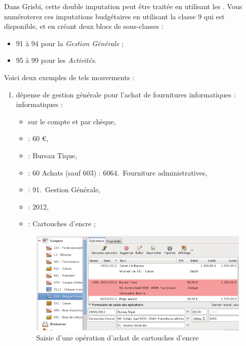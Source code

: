 Dans Grisbi, cette double imputation peut être traitée en utilisant les . Vous numéroterez ces imputations budgétaires en utilisant la classe 9 qui est disponible, et en créant deux blocs de sous-classes :

\begin{itemize}
	\item 91 à 94 pour la \emph{Gestion Générale} ;
	\item 95 à 99 pour les \emph{Activités}.
\end{itemize}

Voici deux exemples de tels mouvements :

\begin{enumerate}
	\item dépense de gestion générale pour l'achat de fournitures \ifIllustration informatiques :
	\else informatiques :
	\fi 
		\begin{itemize}
			\item sur le compte  et par chèque,		
			\item {} : 60 €,					
			\item {} : Bureau Tique,
			\item {} : 60 Achats (sauf 603) : 6064.~Fourniture administratives,
			\item {} : 91.~Gestion Générale,
			\item {} : 2012,
			\item {} : Cartouches d'encre ;
		\end{itemize}

\ifIllustration
\begin{figure}[ht]
\begin{center}
\includegraphics[scale=0.48]{image/screenshot/asso_ink_expense}
\end{center}
\caption{Saisie d'une opération d'achat de cartouches d'encre}
\label{asso-ink-expense-img}
\end{figure}
\fi


\end{enumerate}
